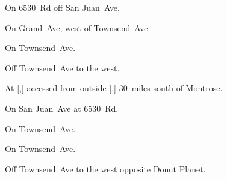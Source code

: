 
\begin{LocationList}

On 6530~Rd off  San Juan~Ave.

On Grand~Ave, west of  Townsend~Ave.

On  Townsend~Ave.

\Location{\GarageHQ \Garage}
Off  Townsend~Ave to the west.

At [,] accessed from  outside [,] 30~miles south of Montrose.

On  San Juan~Ave at 6530~Rd.

\Location{\TruckStop \Gas \Rest \Weigh}
On  Townsend~Ave.

On  Townsend~Ave.

Off  Townsend~Ave to the west opposite Donut Planet.

\end{LocationList}
